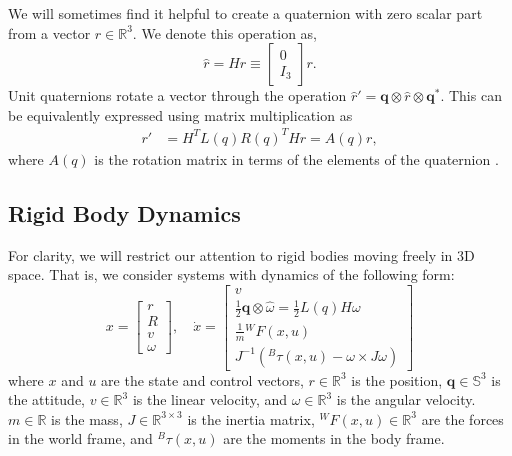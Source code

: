 \documentclass[letterpaper, 10 pt, conference]{ieeeconf}  %
\newcommand{\half}{\frac{1}{2}}
\newcommand{\R}{\mathbb{R}}
\newcommand{\Q}{\mathbb{S}^3}
\newcommand{\q}{\textbf{q}}
\newcommand{\inframe}[2]{{}^{#1}\!#2}
\begin{document}
        We will sometimes find it helpful to create a quaternion with zero scalar part from 
        a vector $r \in \R^3$. We denote this operation as,
        \begin{equation}
            \hat{r} = H r \equiv \begin{bmatrix} 0 \\ I_3 \end{bmatrix} r.
        \end{equation}
        Unit quaternions rotate a vector through the operation 
        $\hat{r}' = \q \otimes \hat{r} \otimes \q^*$. 
        This can be equivalently expressed using matrix multiplication as
        \begin{align} 
            r' &= H^T L(q) R(q)^T H r = A(q)r , \label{eq:quaternion_rotation}
        \end{align}
        where $A(q)$ is the rotation matrix in terms of the elements of the quaternion 
        \cite{kane1983spacecraftdynamics}.

    \subsection{Rigid Body Dynamics} \label{sec:rigidbody_dynamics}
        For clarity, we will restrict our attention to rigid bodies moving freely in 3D 
        space. That is, we consider systems with dynamics of the following form:
        \begin{equation} \label{eq:rigid_body_dynamics}
            x = \begin{bmatrix} r \\ R \\ v \\ \omega \end{bmatrix}, \quad 
            \dot{x} = \begin{bmatrix} 
                v \\ 
                \half \q \otimes \hat{\omega} = \half L(q) H \omega \\ 
                \frac{1}{m} \inframe{W}{F(x,u)} \\ 
                J^{-1}(\inframe{B}{\tau(x,u)} - \omega \times J \omega) 
            \end{bmatrix}
        \end{equation}
        where $x$ and $u$ are the state and control vectors, $r \in \R^3$ is the
        position, $\q \in \Q$ is the attitude, $v \in \R^3$ is the linear velocity, and
        $\omega \in \R^3$ is the angular velocity. $m \in \R$ is the mass, $J \in
        \R^{3\times3}$ is the inertia matrix, $\inframe{W}{F(x,u)} \in \R^3$ are the
        forces in the world frame, and $\inframe{B}{\tau(x,u)}$ are the moments in the
        body frame.
\end{document}
